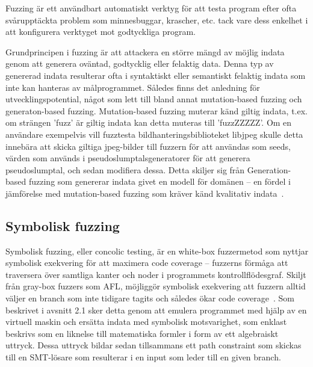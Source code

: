 Fuzzing är ett användbart automatiskt verktyg för att testa program efter ofta
svårupptäckta problem som minnesbuggar, krascher, etc. tack vare dess enkelhet i
att konfigurera verktyget mot godtyckliga program.  

Grundprincipen i fuzzing är att attackera en större mängd av möjlig indata genom
att generera oväntad, godtycklig eller felaktig data. Denna typ av genererad
indata resulterar ofta i syntaktiskt eller semantiskt felaktig indata som inte
kan hanteras av målprogrammet. Således finns det anledning för
utvecklingspotential, något som lett till bland annat mutation-based fuzzing och
generaton-based fuzzing. Mutation-based fuzzing muterar känd giltig indata,
t.ex. om strängen 'fuzz' är giltig indata kan detta muteras till 'fuzzZZZZZ'. Om
en användare exempelvis vill fuzztesta bildhanteringsbiblioteket libjpeg skulle
detta innebära att skicka giltiga jpeg-bilder till fuzzern för att användas som
seeds, värden som används i pseudoslumptalsgeneratorer för att generera
pseudoslumptal, och sedan modifiera dessa. Detta skiljer sig från
Generation-based fuzzing som genererar indata givet en modell för domänen -- en
fördel i jämförelse med mutation-based fuzzing som kräver känd kvalitativ
indata~\cite{fuzzing}. 

\subsection{Symbolisk fuzzing} Symbolisk fuzzing, eller concolic testing, är en
white-box fuzzermetod som nyttjar symbolisk exekvering för att maximera code
coverage -- fuzzerns förmåga att traversera över samtliga kanter och noder i
programmets kontrollflödesgraf. Skiljt från gray-box fuzzers som AFL, möjliggör
symbolisk exekvering att fuzzern alltid väljer en branch som inte tidigare
tagits och således ökar code coverage~\cite{challenges_fuzzing}. Som beskrivet i
avsnitt 2.1 sker detta genom att emulera programmet med hjälp av en virtuell
maskin och ersätta indata med symbolisk motsvarighet, som enklast beskrivs som
en liknelse till matematiska formler i form av ett algebraiskt uttryck. Dessa
uttryck bildar sedan tillsammans ett path constraint som skickas till en
SMT-lösare som resulterar i en input som leder till en given branch. 

